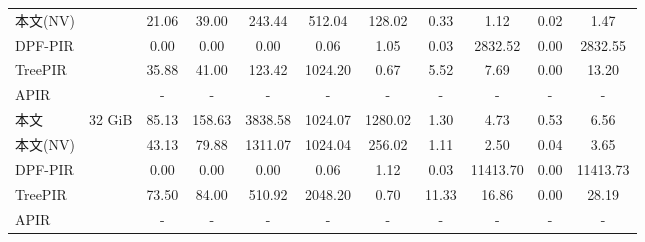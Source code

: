 \begin{table}[]
{\begin{tabular}{@{}lc|ccc|cccccc@{}}
        本文(NV) &                           & 21.06                        & 39.00                      & 243.44  & 512.04                        & \multicolumn{1}{c|}{128.02}  & 0.33  & 1.12     & 0.02        & 1.47     \\
        DPF-PIR       &                           & 0.00                         & 0.00                       & 0.00    & 0.06                          & \multicolumn{1}{c|}{1.05}    & 0.03  & 2832.52  & 0.00        & 2832.55  \\
        TreePIR   &                           & 35.88                        & 41.00                      & 123.42  & 1024.20                       & \multicolumn{1}{c|}{0.67}    & 5.52  & 7.69     & 0.00        & 13.20    \\
        APIR      &                           & -                            & -                          & -       & -                             & \multicolumn{1}{c|}{-}       & -     & -        & -           & -        \\ \midrule
        本文     & \multirow{5}{*}{32 GiB}  & 85.13                        & 158.63                     & 3838.58 & 1024.07                       & \multicolumn{1}{c|}{1280.02} & 1.30  & 4.73     & 0.53        & 6.56     \\
        本文(NV) &                           & 43.13                        & 79.88                      & 1311.07 & 1024.04                       & \multicolumn{1}{c|}{256.02}  & 1.11  & 2.50     & 0.04        & 3.65     \\
        DPF-PIR       &                           & 0.00                         & 0.00                       & 0.00    & 0.06                          & \multicolumn{1}{c|}{1.12}    & 0.03  & 11413.70 & 0.00        & 11413.73 \\
        TreePIR   &                           & 73.50                        & 84.00                      & 510.92  & 2048.20                       & \multicolumn{1}{c|}{0.70}    & 11.33 & 16.86    & 0.00        & 28.19    \\
        APIR      &                           & -                            & -                          & -       & -                             & \multicolumn{1}{c|}{-}       & -     & -        & -           & -        \\ \bottomrule
    \end{tabular}
    }
\end{table}

